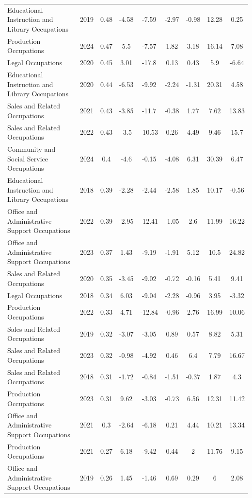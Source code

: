 \begin{table}[htbp]
\begin{tabular}{lcccccccc}
Educational Instruction and Library Occupations & 2019 & 0.48 & -4.58 & -7.59 & -2.97 & -0.98 & 12.28 & 0.25 \\
Production Occupations & 2024 & 0.47 & 5.5 & -7.57 & 1.82 & 3.18 & 16.14 & 7.08 \\
Legal Occupations & 2020 & 0.45 & 3.01 & -17.8 & 0.13 & 0.43 & 5.9 & -6.64 \\
Educational Instruction and Library Occupations & 2020 & 0.44 & -6.53 & -9.92 & -2.24 & -1.31 & 20.31 & 4.58 \\
Sales and Related Occupations & 2021 & 0.43 & -3.85 & -11.7 & -0.38 & 1.77 & 7.62 & 13.83 \\
Sales and Related Occupations & 2022 & 0.43 & -3.5 & -10.53 & 0.26 & 4.49 & 9.46 & 15.7 \\
Community and Social Service Occupations & 2024 & 0.4 & -4.6 & -0.15 & -4.08 & 6.31 & 30.39 & 6.47 \\
Educational Instruction and Library Occupations & 2018 & 0.39 & -2.28 & -2.44 & -2.58 & 1.85 & 10.17 & -0.56 \\
Office and Administrative Support Occupations & 2022 & 0.39 & -2.95 & -12.41 & -1.05 & 2.6 & 11.99 & 16.22 \\
Office and Administrative Support Occupations & 2023 & 0.37 & 1.43 & -9.19 & -1.91 & 5.12 & 10.5 & 24.82 \\
Sales and Related Occupations & 2020 & 0.35 & -3.45 & -9.02 & -0.72 & -0.16 & 5.41 & 9.41 \\
Legal Occupations & 2018 & 0.34 & 6.03 & -9.04 & -2.28 & -0.96 & 3.95 & -3.32 \\
Production Occupations & 2022 & 0.33 & 4.71 & -12.84 & -0.96 & 2.76 & 16.99 & 10.06 \\
Sales and Related Occupations & 2019 & 0.32 & -3.07 & -3.05 & 0.89 & 0.57 & 8.82 & 5.31 \\
Sales and Related Occupations & 2023 & 0.32 & -0.98 & -4.92 & 0.46 & 6.4 & 7.79 & 16.67 \\
Sales and Related Occupations & 2018 & 0.31 & -1.72 & -0.84 & -1.51 & -0.37 & 1.87 & 4.3 \\
Production Occupations & 2023 & 0.31 & 9.62 & -3.03 & -0.73 & 6.56 & 12.31 & 11.42 \\
Office and Administrative Support Occupations & 2021 & 0.3 & -2.64 & -6.18 & 0.21 & 4.44 & 10.21 & 13.34 \\
Production Occupations & 2021 & 0.27 & 6.18 & -9.42 & 0.44 & 2 & 11.76 & 9.15 \\
Office and Administrative Support Occupations & 2019 & 0.26 & 1.45 & -1.46 & 0.69 & 0.29 & 6 & 2.08 \\

\end{tabular}
\end{table}
